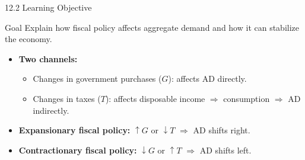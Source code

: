 \documentclass[aspectratio=169]{beamer}
\begin{document}
\begin{frame}{12.2 Learning Objective}
\transfade
\begin{block}{Goal}
Explain how fiscal policy affects aggregate demand and how it can stabilize the economy.
\end{block}
\begin{itemize}[<+->]
  \item \textbf{Two channels:}
  \begin{itemize}[<+->]
    \item Changes in government purchases ($G$): affects AD \alert{directly}.
    \item Changes in taxes ($T$): affects disposable income $\Rightarrow$ consumption $\Rightarrow$ AD \alert{indirectly}.
  \end{itemize}
  \item \textbf{Expansionary fiscal policy:} $\uparrow G$ or $\downarrow T$ $\Rightarrow$ AD shifts right.
  \item \textbf{Contractionary fiscal policy:} $\downarrow G$ or $\uparrow T$ $\Rightarrow$ AD shifts left.
\end{itemize}
\end{frame}
\end{document}
